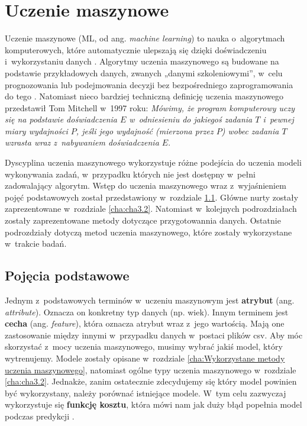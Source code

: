\chapter{Uczenie maszynowe}
\label{cha:ucz.masz}

Uczenie maszynowe (ML, od ang. \textit{machine learning}) to nauka o~algorytmach komputerowych, które automatycznie ulepszają się dzięki doświadczeniu i~wykorzystaniu danych \cite{Mitchell97}. Algorytmy uczenia maszynowego są budowane na podstawie przykładowych danych, zwanych „danymi szkoleniowymi”, w~celu prognozowania lub podejmowania decyzji bez bezpośredniego zaprogramowania do tego \cite{Koza96}. Natomiast nieco bardziej techniczną definicję uczenia maszynowego przedstawił Tom Mitchell w~1997 roku: \textit{Mówimy, że program komputerowy uczy się na podstawie doświadczenia $E$ w~odniesieniu do jakiegoś zadania $T$ i~pewnej miary wydajności $P$, jeśli jego wydajność (mierzona przez $P$) wobec zadania $T$ wzrasta wraz z~nabywaniem doświadczenia $E$}.

Dyscyplina uczenia maszynowego wykorzystuje różne podejścia do uczenia modeli wykonywania zadań, w~przypadku których nie jest dostępny w~pełni zadowalający algorytm. Wstęp do uczenia maszynowego wraz z~wyjaśnieniem pojęć podstawowych został przedstawiony w~rozdziale \ref{cha:pojecia}. Główne nurty zostały zaprezentowane w~rozdziale \ref{cha:cha3.2}. Natomiast w~kolejnych podrozdziałach zostały zaprezentowane metody dotyczące przygotowannia danych. Ostatnie podrozdziały dotyczą metod  uczenia maszynowego, które zostały wykorzystane w~trakcie badań.

\section{Pojęcia podstawowe}
\label{cha:pojecia}

Jednym z~podstawowych terminów w~uczeniu maszynowym jest \textbf{atrybut} (ang. \textit{attribute}). Oznacza on konkretny typ danych (np. wiek). Innym terminem jest \textbf{cecha} (ang. \textit{feature}), która oznacza atrybut wraz z~jego wartością. Mają one zastosowanie między innymi w~przypadku danych w~postaci plików csv. Aby móc skorzystać z~mocy uczenia maszynowego, musimy wybrać jakiś model, który wytrenujemy. Modele zostały opisane w~rozdziale \ref{cha:Wykorzystane metody uczenia maszynowego}, natomiast ogólne typy uczenia maszynowego w~rozdziale \ref{cha:cha3.2}. Jednakże, zanim ostatecznie zdecydujemy się który model powinien być wykorzystany, należy porównać istniejące modele. W~tym celu zazwyczaj wykorzystuje się \textbf{funkcję kosztu}, która mówi nam jak duży błąd popełnia model podczas predykcji \cite{Sawka18}. 

